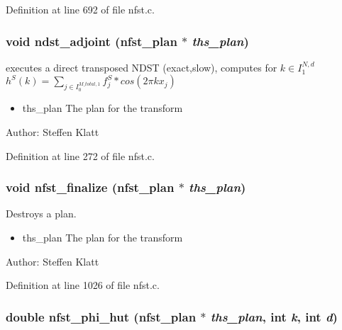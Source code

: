 Definition at line 692 of file nfst.c.\hypertarget{group__nfsct_g684ed95d0a523eed202573fb928a3725}{
\subsubsection{\setlength{\rightskip}{0pt plus 5cm}void ndst\_\-adjoint ({\bf nfst\_\-plan} $\ast$ {\em ths\_\-plan})}}
\label{group__nfsct_g684ed95d0a523eed202573fb928a3725}


executes a direct transposed NDST (exact,slow), computes for $k \in I_1^{N,d}$ $h^S(k) = \sum_{j \in I_0^{M\_total,1}} f_j^S * cos(2 \pi k x_j)$ 

\begin{itemize}
\item ths\_\-plan The plan for the transform\end{itemize}
\begin{Desc}
\item[Author:]Steffen Klatt \end{Desc}


Definition at line 272 of file nfst.c.\hypertarget{group__nfsct_gb5d03eeff969c872061d96998f9f0405}{
\subsubsection{\setlength{\rightskip}{0pt plus 5cm}void nfst\_\-finalize ({\bf nfst\_\-plan} $\ast$ {\em ths\_\-plan})}}
\label{group__nfsct_gb5d03eeff969c872061d96998f9f0405}


Destroys a plan. 

\begin{itemize}
\item ths\_\-plan The plan for the transform\end{itemize}
\begin{Desc}
\item[Author:]Steffen Klatt \end{Desc}


Definition at line 1026 of file nfst.c.\hypertarget{group__nfsct_ga2862de70644887849e0bc1df618a018}{
\subsubsection{\setlength{\rightskip}{0pt plus 5cm}double nfst\_\-phi\_\-hut ({\bf nfst\_\-plan} $\ast$ {\em ths\_\-plan}, int {\em k}, int {\em d})}}
\label{group__nfsct_ga2862de70644887849e0bc1df618a018}


